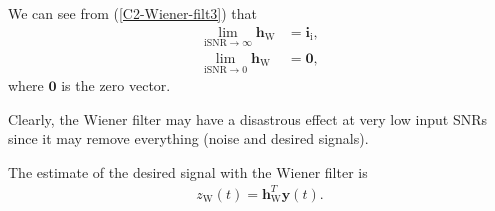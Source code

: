 \documentclass[10pt,pdflatex,headrule,landscape]{beamer}
\begin{document}
\begin{frame}[allowframebreaks]
We can see from (\ref{C2-Wiener-filt3}) that
\begin{align}
 \lim_{ \mathrm{iSNR} \rightarrow \infty} \mathbf{h}_{\mathrm{W}} &= \mathbf{i}_{\mathrm{i}}, \\
 \lim_{ {\mathrm{iSNR}} \rightarrow 0} \mathbf{h}_{\mathrm{W}} &= \mathbf{0},
\end{align}
where $\mathbf{0}$ is the zero vector.

Clearly, the Wiener filter may have a disastrous effect at very low input SNRs since it may remove
everything (noise and desired signals).

The estimate of the desired signal with the Wiener filter is
\begin{eqnarray}
 \label{C2-z(t)-Wien}
 z_{\mathrm{W}}(t) = \mathbf{h}_{\mathrm{W}}^T \mathbf{y}(t) .
\end{eqnarray}

\end{frame}
\end{document}
